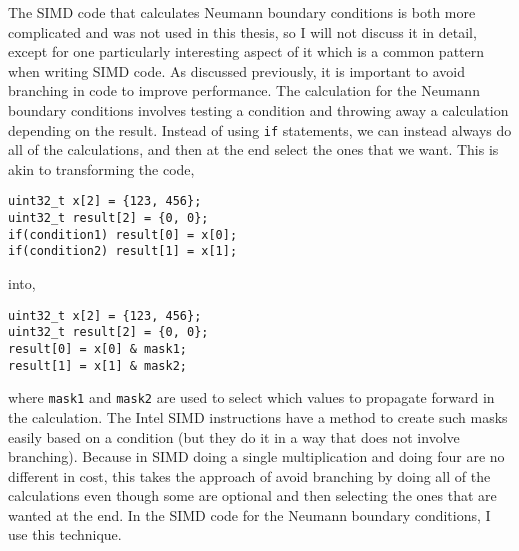 The SIMD code that calculates Neumann boundary conditions is both more complicated and was not used in this thesis, so I will not discuss it in detail, except for one
particularly interesting aspect of it which is a common pattern when writing SIMD code. As discussed previously, it is important to avoid branching in code to improve
performance. The calculation for the Neumann boundary conditions involves testing a condition and throwing away a calculation depending on the result. Instead of
using \texttt{if} statements, we can instead always do all of the calculations, and then at the end select the ones that we want. This is akin to transforming the
code,
\begin{addmargin}[4em]{2em}%
\begin{singlespace}
\texttt{uint32\_t x[2] = \{123, 456\};}\\
\texttt{uint32\_t result[2] = \{0, 0\};}\\
\texttt{if(condition1) result[0] = x[0];}\\
\texttt{if(condition2) result[1] = x[1];}\\
\end{singlespace}
\end{addmargin}
into,
\begin{addmargin}[4em]{2em}%
\begin{singlespace}
\texttt{uint32\_t x[2] = \{123, 456\};}\\
\texttt{uint32\_t result[2] = \{0, 0\};}\\
\texttt{result[0] = x[0] \& mask1;}\\
\texttt{result[1] = x[1] \& mask2;}\\
\end{singlespace}
\end{addmargin}
where \texttt{mask1} and \texttt{mask2} are used to select which values to propagate forward in the calculation. The Intel SIMD instructions have a method to
create such masks easily based on a condition (but they do it in a way that does not involve branching). Because in SIMD doing a single multiplication and doing
four are no different in cost, this takes the approach of avoid branching by doing all of the calculations even though some are optional and then selecting the
ones that are wanted at the end.
In the SIMD code for the Neumann boundary conditions,
I use this technique.

